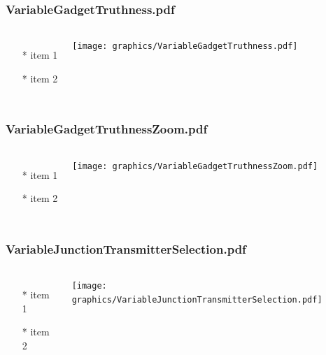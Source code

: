 \begin{frame} \frametitle{VariableGadgetTruthness.pdf}
    \begin{columns}[c]
        \begin{itemize}
            \item[*] item 1
            \item[*] item 2
        \end{itemize}
        \begin{minipage}{\linewidth}
            \begin{center}
            \texttt{[image: graphics/VariableGadgetTruthness.pdf]}
            \label{gfx:VariableGadgetTruthness.pdf}
            \end{center}
        \end{minipage}
    \end{columns}
\end{frame}
\begin{frame} \frametitle{VariableGadgetTruthnessZoom.pdf}
    \begin{columns}[c]
        \begin{itemize}
            \item[*] item 1
            \item[*] item 2
        \end{itemize}
        \begin{minipage}{\linewidth}
            \begin{center}
            \texttt{[image: graphics/VariableGadgetTruthnessZoom.pdf]}
            \label{gfx:VariableGadgetTruthnessZoom.pdf}
            \end{center}
        \end{minipage}
    \end{columns}
\end{frame}
\begin{frame} \frametitle{VariableJunctionTransmitterSelection.pdf}
    \begin{columns}[c]
        \begin{itemize}
            \item[*] item 1
            \item[*] item 2
        \end{itemize}
        \begin{minipage}{\linewidth}
            \begin{center}
            \texttt{[image: graphics/VariableJunctionTransmitterSelection.pdf]}
            \label{gfx:VariableJunctionTransmitterSelection.pdf}
            \end{center}
        \end{minipage}
    \end{columns}
\end{frame}
